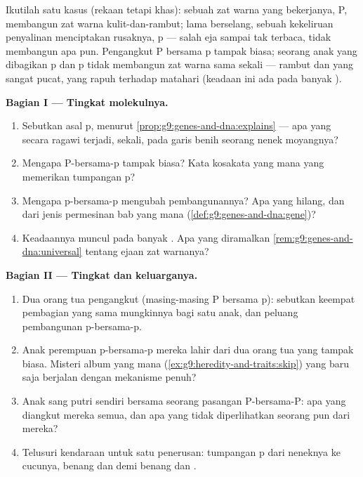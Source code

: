 \begin{problem}\label{pb:g9:genes-and-dna:1}
Ikutilah satu kasus (rekaan tetapi khas): sebuah  zat
warna yang  bekerjanya, P, membangun zat warna
kulit-dan-rambut; lama berselang, sebuah kekeliruan
penyalinan menciptakan  rusaknya, p --- salah eja sampai
tak terbaca, tidak membangun apa pun. Pengangkut P bersama p
tampak biasa; seorang anak yang dibagikan p dan p tidak
membangun zat warna sama sekali --- rambut dan  yang
sangat pucat,  yang rapuh terhadap matahari (keadaan ini
ada pada banyak ).

\medskip\noindent\textbf{Bagian I --- Tingkat molekulnya.}
\begin{enumerate}
  \item Sebutkan asal p, menurut
        \cref{prop:g9:genes-and-dna:explains} --- apa yang
        secara ragawi terjadi, sekali, pada garis benih
        seorang nenek moyangnya?
  \item Mengapa P-bersama-p tampak biasa? Kata kosakata yang
        mana yang memerikan tumpangan p?
  \item Mengapa p-bersama-p mengubah pembangunannya? Apa
        yang hilang, dan dari jenis permesinan bab yang mana
        (\cref{def:g9:genes-and-dna:gene})?
  \item Keadaannya muncul pada banyak . Apa yang
        diramalkan \cref{rem:g9:genes-and-dna:universal}
        tentang ejaan  zat warnanya?
\end{enumerate}

\medskip\noindent\textbf{Bagian II --- Tingkat 
dan keluarganya.}
\begin{enumerate}[resume]
  \item Dua orang tua pengangkut (masing-masing P bersama
        p): sebutkan keempat pembagian yang sama mungkinnya
        bagi satu anak, dan peluang pembangunan p-bersama-p.
  \item Anak perempuan p-bersama-p mereka lahir dari dua
        orang tua yang tampak biasa. Misteri album yang mana
        (\cref{ex:g9:heredity-and-traits:skip}) yang baru
        saja berjalan dengan mekanisme penuh?
  \item Anak sang putri sendiri bersama seorang pasangan
        P-bersama-P: apa yang diangkut mereka semua, dan apa
        yang tidak diperlihatkan seorang pun dari mereka?
  \item Telusuri kendaraan  untuk satu penerusan:
        tumpangan p dari neneknya ke cucunya, benang dan
         demi benang dan .
\end{enumerate}


\end{problem}
